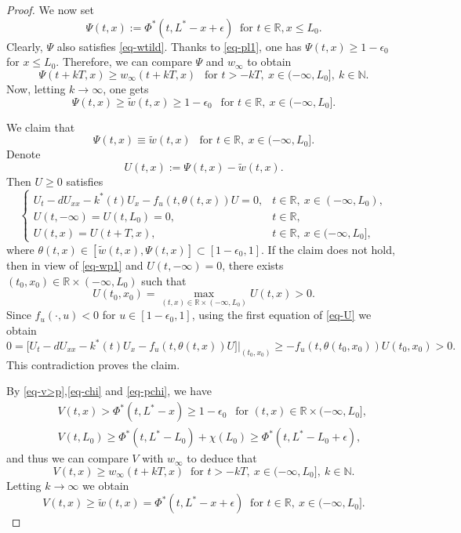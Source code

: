 \documentclass[10pt,a4paper]{amsart}
\begin{document}
\begin{proof}
We now set 
$$\Psi(t,x):=\Phi^*(t,L^*-x+\epsilon) ~\text{ for }t\in\mathbb R, x\leq L_0.$$
Clearly, $\Psi$ also satisfies \eqref{eq-wtild}. Thanks to \eqref{eq-pl1}, one has $\Psi(t,x)\geq 1-\epsilon_0$ for $x\leq L_0$. Therefore, we can compare $\Psi$ and $w_\infty$  to obtain
\begin{equation*}
  \Psi(t+kT,x)\geq  w_\infty(t+kT,x)~~\text{ for } t>-kT,\  x\in(-\infty,L_0],\  k\in\mathbb N.
\end{equation*}
Now, letting $k\to\infty$, one gets
\begin{equation}\label{eq-wp1}
  \Psi(t,x)\geq \tilde{w}(t,x)\geq 1-\epsilon_0~~\text{ for }t\in\mathbb{R},\ x\in(-\infty,L_0].
\end{equation}

We claim that 
\begin{equation*}
  \Psi(t,x)\equiv \tilde{w}(t,x)~~ \text{ for }t\in\mathbb{R},\  x\in(-\infty,L_0].
\end{equation*}
Denote
\begin{equation*}
  U(t,x):=\Psi(t,x)-\tilde{w}(t,x).
\end{equation*}
Then $U\geq 0$ satisfies 
\begin{equation}\label{eq-U}\begin{cases}
  U_t-dU_{xx}-k^*(t)U_x-f_u(t,\theta(t,x))U=0,&t\in\mathbb{R},\  x\in(-\infty,L_0),\\
  U(t,-\infty)=U(t,L_0)=0,&t\in\mathbb{R},\\
  U(t,x)=U(t+T,x), &t\in\mathbb{R},\ x\in(-\infty, L_0],
\end{cases}
\end{equation}
where $\theta(t,x)\in[\tilde{w}(t,x),\Psi(t,x)]\subset[1-\epsilon_0,1]$.
If the claim does not hold, then in view of \eqref{eq-wp1} and $U(t,-\infty)=0$, there exists $(t_0,x_0)\in\mathbb{R}\times(-\infty,L_0)$ such that 
$$U(t_0,x_0)=\max_{(t,x)\in\mathbb{R}\times(-\infty,L_0)}U(t,x)>0.$$
Since  $f_u(\cdot,u)<0$ for $u\in[1-\epsilon_0,1]$, using the first equation of \eqref{eq-U} we obtain
\begin{equation*}
  0=\big[U_t-dU_{xx}-k^*(t)U_x-f_u(t,\theta(t,x))U\big]\big|_{(t_0,x_0)}\geq -f_u(t,\theta(t_0,x_0))U(t_0,x_0)>0.
\end{equation*}
This contradiction proves the claim.

By \eqref{eq-v>p},\eqref{eq-chi} and \eqref{eq-pchi}, we have
\begin{eqnarray*}
  &&V(t,x)> \Phi^*(t,L^*-x)\geq 1-\epsilon_0 ~~\text{ for } (t,x)\in\mathbb R \times(-\infty,L_0],\\
  && V(t,L_0)\geq \Phi^*(t,L^*-L_0)+\chi (L_0)\geq  \Phi^*(t,L^*-L_0+\epsilon),
\end{eqnarray*}
 and thus we can compare $V$ with $w_\infty$  to deduce that 
\[ V(t,x)\geq w_\infty(t+kT,x)~\text{ for }t>-kT,\ x\in(-\infty,L_0],\  k\in\mathbb N.\]
Letting $k\to\infty$ we obtain 
\begin{equation}\label{eq-vw}
  V(t,x)\geq \tilde{w}(t,x)=\Phi^*(t,L^*-x+\epsilon) ~\text{ for }t\in\mathbb R,\ x\in(-\infty,L_0].
\end{equation}


\end{proof}
\end{document}
